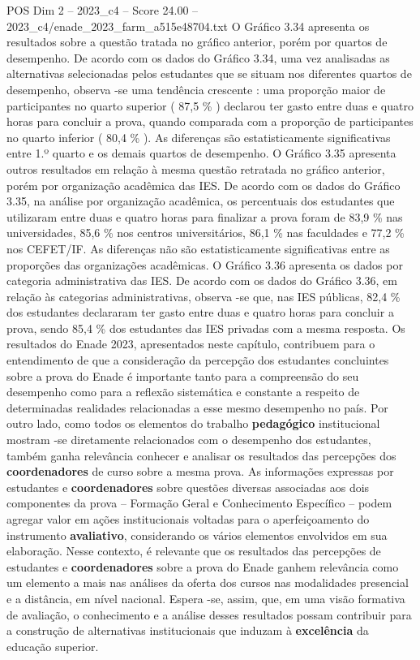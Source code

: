 \begin{textsample}{POS Dim 2 – 2023\_c4 – Score 24.00 – 2023\_c4/enade\_2023\_farm\_a515e48704.txt}
O Gráfico 3.34 apresenta os resultados sobre a questão tratada no gráfico anterior, porém por quartos de desempenho.
De acordo com os dados do Gráfico 3.34, uma vez analisadas as alternativas selecionadas pelos estudantes que se situam nos diferentes quartos de desempenho, observa -se uma tendência crescente : uma proporção maior de participantes no quarto superior ( 87,5 \% ) declarou ter gasto entre duas e quatro horas para concluir a prova, quando comparada com a proporção de participantes no quarto inferior ( 80,4 \% ).
As diferenças são estatisticamente significativas entre 1.º quarto e os demais quartos de desempenho.
O Gráfico 3.35 apresenta outros resultados em relação à mesma questão retratada no gráfico anterior, porém por organização acadêmica das IES.
De acordo com os dados do Gráfico 3.35, na análise por organização acadêmica, os percentuais dos estudantes que utilizaram entre duas e quatro horas para finalizar a prova foram de 83,9 \% nas universidades, 85,6 \% nos centros universitários, 86,1 \% nas faculdades e 77,2 \% nos CEFET/IF.
As diferenças não são estatisticamente significativas entre as proporções das organizações acadêmicas.
O Gráfico 3.36 apresenta os dados por categoria administrativa das IES.
De acordo com os dados do Gráfico 3.36, em relação às categorias administrativas, observa -se que, nas IES públicas, 82,4 \% dos estudantes declararam ter gasto entre duas e quatro horas para concluir a prova, sendo 85,4 \% dos estudantes das IES privadas com a mesma resposta.
Os resultados do Enade 2023, apresentados neste capítulo, contribuem para o entendimento de que a consideração da percepção dos estudantes concluintes sobre a prova do Enade é importante tanto para a compreensão do seu desempenho como para a reflexão sistemática e constante a respeito de determinadas realidades relacionadas a esse mesmo desempenho no país.
Por outro lado, como todos os elementos do trabalho \textbf{pedagógico} institucional mostram -se diretamente relacionados com o desempenho dos estudantes, também ganha relevância conhecer e analisar os resultados das percepções dos \textbf{coordenadores} de curso sobre a mesma prova.
As informações expressas por estudantes e \textbf{coordenadores} sobre questões diversas associadas aos dois componentes da prova – Formação Geral e Conhecimento Específico – podem agregar valor em ações institucionais voltadas para o aperfeiçoamento do instrumento \textbf{avaliativo}, considerando os vários elementos envolvidos em sua elaboração.
Nesse contexto, é relevante que os resultados das percepções de estudantes e \textbf{coordenadores} sobre a prova do Enade ganhem relevância como um elemento a mais nas análises da oferta dos cursos nas modalidades presencial e a distância, em nível nacional.
Espera -se, assim, que, em uma visão formativa de avaliação, o conhecimento e a análise desses resultados possam contribuir para a construção de alternativas institucionais que induzam à \textbf{excelência} da educação superior.


\end{textsample}
